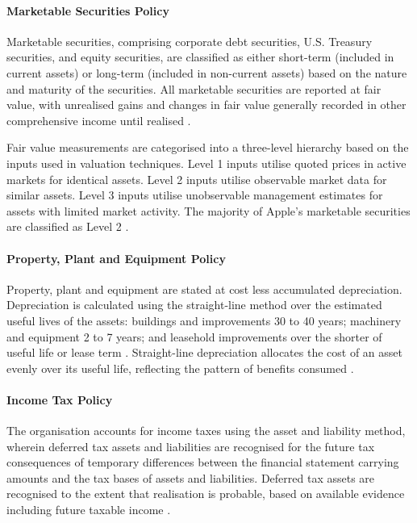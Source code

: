 \documentclass[12pt,a4paper]{article}
\begin{document}
\paragraph{Marketable Securities Policy}

Marketable securities, comprising corporate debt securities, U.S. Treasury securities, and equity securities, are classified as either short-term (included in current assets) or long-term (included in non-current assets) based on the nature and maturity of the securities. All marketable securities are reported at fair value, with unrealised gains and changes in fair value generally recorded in other comprehensive income until realised \citep{apple202410k}.

Fair value measurements are categorised into a three-level hierarchy based on the inputs used in valuation techniques. Level 1 inputs utilise quoted prices in active markets for identical assets. Level 2 inputs utilise observable market data for similar assets. Level 3 inputs utilise unobservable management estimates for assets with limited market activity. The majority of Apple's marketable securities are classified as Level 2 \citep{fasb2024}.

\paragraph{Property, Plant and Equipment Policy}

Property, plant and equipment are stated at cost less accumulated depreciation. Depreciation is calculated using the straight-line method over the estimated useful lives of the assets: buildings and improvements 30 to 40 years; machinery and equipment 2 to 7 years; and leasehold improvements over the shorter of useful life or lease term \citep{apple202410k}. Straight-line depreciation allocates the cost of an asset evenly over its useful life, reflecting the pattern of benefits consumed \citep{kieso2023}.

\paragraph{Income Tax Policy}

The organisation accounts for income taxes using the asset and liability method, wherein deferred tax assets and liabilities are recognised for the future tax consequences of temporary differences between the financial statement carrying amounts and the tax bases of assets and liabilities. Deferred tax assets are recognised to the extent that realisation is probable, based on available evidence including future taxable income \citep{kieso2023}.
\end{document}
